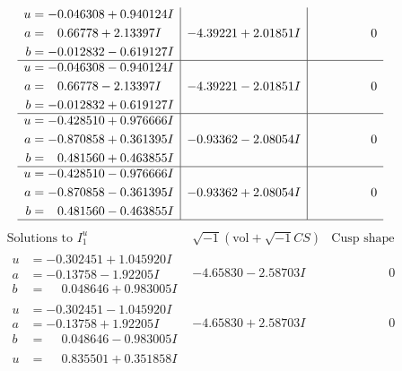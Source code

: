 \documentclass[1p]{elsarticle_modified}
\theoremstyle{definition}
\newcommand{\I}{\sqrt{-1}}
\begin{document}
$$\begin{array}{c|c|c}
\begin{aligned}
u &= -0.046308 + 0.940124 I \\
a &= \phantom{-}0.66778 + 2.13397 I \\
b &= -0.012832 - 0.619127 I\end{aligned}
 & -4.39221 + 2.01851 I & \phantom{-0.000000 } 0 \\ \hline\begin{aligned}
u &= -0.046308 - 0.940124 I \\
a &= \phantom{-}0.66778 - 2.13397 I \\
b &= -0.012832 + 0.619127 I\end{aligned}
 & -4.39221 - 2.01851 I & \phantom{-0.000000 } 0 \\ \hline\begin{aligned}
u &= -0.428510 + 0.976666 I \\
a &= -0.870858 + 0.361395 I \\
b &= \phantom{-}0.481560 + 0.463855 I\end{aligned}
 & -0.93362 - 2.08054 I & \phantom{-0.000000 } 0 \\ \hline\begin{aligned}
u &= -0.428510 - 0.976666 I \\
a &= -0.870858 - 0.361395 I \\
b &= \phantom{-}0.481560 - 0.463855 I\end{aligned}
 & -0.93362 + 2.08054 I & \phantom{-0.000000 } 0\\
 \hline 
 \end{array}$$\newpage$$\begin{array}{c|c|c}  
\text{Solutions to }I^u_{1}& \I (\text{vol} + \sqrt{-1}CS) & \text{Cusp shape}\\
 \hline 
\begin{aligned}
u &= -0.302451 + 1.045920 I \\
a &= -0.13758 - 1.92205 I \\
b &= \phantom{-}0.048646 + 0.983005 I\end{aligned}
 & -4.65830 - 2.58703 I & \phantom{-0.000000 } 0 \\ \hline\begin{aligned}
u &= -0.302451 - 1.045920 I \\
a &= -0.13758 + 1.92205 I \\
b &= \phantom{-}0.048646 - 0.983005 I\end{aligned}
 & -4.65830 + 2.58703 I & \phantom{-0.000000 } 0 \\ \hline\begin{aligned}
u &= \phantom{-}0.835501 + 0.351858 I \\

\end{aligned}
\end{array}$$
\end{document}
